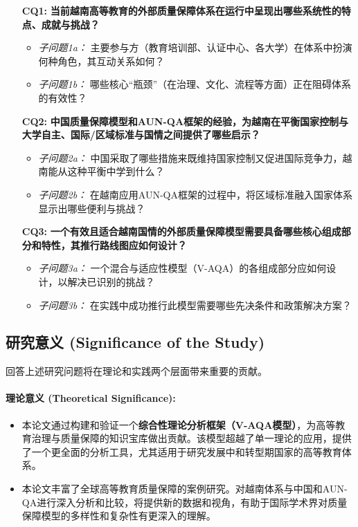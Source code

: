 \begin{enumerate}
    \item[\textbf{CQ1:}] \textbf{当前越南高等教育的外部质量保障体系在运行中呈现出哪些系统性的特点、成就与挑战？}
    \begin{itemize}
        \item \textit{子问题1a：} 主要参与方（教育培训部、认证中心、各大学）在体系中扮演何种角色，其互动关系如何？
        \item \textit{子问题1b：} 哪些核心“瓶颈”（在治理、文化、流程等方面）正在阻碍体系的有效性？
    \end{itemize}

    \item[\textbf{CQ2:}] \textbf{中国质量保障模型和AUN-QA框架的经验，为越南在平衡国家控制与大学自主、国际/区域标准与国情之间提供了哪些启示？}
    \begin{itemize}
        \item \textit{子问题2a：} 中国采取了哪些措施来既维持国家控制又促进国际竞争力，越南能从这种平衡中学到什么？
        \item \textit{子问题2b：} 在越南应用AUN-QA框架的过程中，将区域标准融入国家体系显示出哪些便利与挑战？
    \end{itemize}

    \item[\textbf{CQ3:}] \textbf{一个有效且适合越南国情的外部质量保障模型需要具备哪些核心组成部分和特性，其推行路线图应如何设计？}
    \begin{itemize}
        \item \textit{子问题3a：} 一个混合与适应性模型（V-AQA）的各组成部分应如何设计，以解决已识别的挑战？
        \item \textit{子问题3b：} 在实践中成功推行此模型需要哪些先决条件和政策解决方案？
    \end{itemize}
\end{enumerate}

\subsection{研究意义 (Significance of the Study)}
\label{subsec:y_nghia_nghien_cuu}

回答上述研究问题将在理论和实践两个层面带来重要的贡献。

\paragraph{理论意义 (Theoretical Significance):}
\begin{itemize}
    \item 本论文通过构建和验证一个\textbf{综合性理论分析框架（V-AQA模型）}，为高等教育治理与质量保障的知识宝库做出贡献。该模型超越了单一理论的应用，提供了一个更全面的分析工具，尤其适用于研究发展中和转型期国家的高等教育体系。
    \item 本论文丰富了全球高等教育质量保障的案例研究。对越南体系与中国和AUN-QA进行深入分析和比较，将提供新的数据和视角，有助于国际学术界对质量保障模型的多样性和复杂性有更深入的理解。
\end{itemize}

